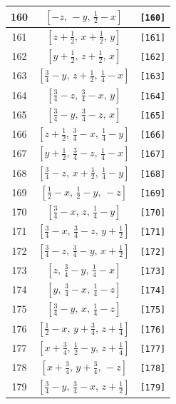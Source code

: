 \documentclass[fleqn,8pt]{jsarticle}
\begin{document}
\begin{longtable}{ccc}
160 & $\left[ - z,\, - y,\, \frac{1}{2} - x \right]$ & {\tt [160]} \\ \hline
161 & $\left[ z + \frac{1}{2},\, x + \frac{1}{2},\, y \right]$ & {\tt [161]} \\ \hline
162 & $\left[ y + \frac{1}{2},\, z + \frac{1}{2},\, x \right]$ & {\tt [162]} \\ \hline
163 & $\left[ \frac{3}{4} - y,\, z + \frac{1}{2},\, \frac{1}{4} - x \right]$ & {\tt [163]} \\ \hline
164 & $\left[ \frac{3}{4} - z,\, \frac{3}{4} - x,\, y \right]$ & {\tt [164]} \\ \hline
165 & $\left[ \frac{3}{4} - y,\, \frac{3}{4} - z,\, x \right]$ & {\tt [165]} \\ \hline
166 & $\left[ z + \frac{1}{2},\, \frac{3}{4} - x,\, \frac{1}{4} - y \right]$ & {\tt [166]} \\ \hline
167 & $\left[ y + \frac{1}{2},\, \frac{3}{4} - z,\, \frac{1}{4} - x \right]$ & {\tt [167]} \\ \hline
168 & $\left[ \frac{3}{4} - z,\, x + \frac{1}{2},\, \frac{1}{4} - y \right]$ & {\tt [168]} \\ \hline
169 & $\left[ \frac{1}{2} - x,\, \frac{1}{2} - y,\, - z \right]$ & {\tt [169]} \\ \hline
170 & $\left[ \frac{3}{4} - x,\, z,\, \frac{1}{4} - y \right]$ & {\tt [170]} \\ \hline
171 & $\left[ \frac{3}{4} - x,\, \frac{3}{4} - z,\, y + \frac{1}{2} \right]$ & {\tt [171]} \\ \hline
172 & $\left[ \frac{3}{4} - z,\, \frac{3}{4} - y,\, x + \frac{1}{2} \right]$ & {\tt [172]} \\ \hline
173 & $\left[ z,\, \frac{3}{4} - y,\, \frac{1}{4} - x \right]$ & {\tt [173]} \\ \hline
174 & $\left[ y,\, \frac{3}{4} - x,\, \frac{1}{4} - z \right]$ & {\tt [174]} \\ \hline
175 & $\left[ \frac{3}{4} - y,\, x,\, \frac{1}{4} - z \right]$ & {\tt [175]} \\ \hline
176 & $\left[ \frac{1}{2} - x,\, y + \frac{3}{4},\, z + \frac{1}{4} \right]$ & {\tt [176]} \\ \hline
177 & $\left[ x + \frac{3}{4},\, \frac{1}{2} - y,\, z + \frac{1}{4} \right]$ & {\tt [177]} \\ \hline
178 & $\left[ x + \frac{3}{4},\, y + \frac{3}{4},\, - z \right]$ & {\tt [178]} \\ \hline
179 & $\left[ \frac{3}{4} - y,\, \frac{3}{4} - x,\, z + \frac{1}{2} \right]$ & {\tt [179]} \\ \hline

\end{longtable}
\end{document}
